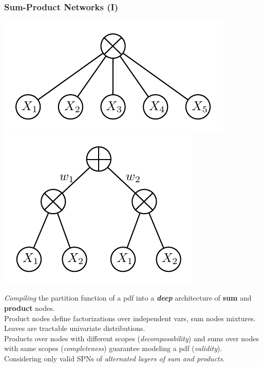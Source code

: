 \documentclass[xcolor={usenames,dvipsnames,svgnames}, compress]{beamer}
\begin{document}
\begin{frame}
  \frametitle{Sum-Product Networks (I)}
  \begin{minipage}{0.45\linewidth}
    \centering
    \includegraphics[width=0.8\linewidth]{figures/spn-prod}\\
    \includegraphics[width=0.73\linewidth]{figures/spn-sum}
  \end{minipage}%
  \begin{minipage}{0.5\linewidth}
    \vspace{0pt}
    \footnotesize
    \emph{Compiling} the partition function of a pdf into a \textbf{\emph{deep}} architecture of \textbf{sum}
    and \textbf{product} nodes.\\

    Product nodes define factorizations over independent vars, sum
    nodes mixtures. Leaves are tractable univariate distributions.\\


    Products over nodes with different scopes (\emph{decomposability}) and
    sums over nodes with same scopes (\emph{completeness}) guarantee modeling
    a pdf (\emph{validity}).\\

    Considering only valid SPNs of \emph{alternated layers of sum and products}.

    

    

  \end{minipage}
\end{frame}
\end{document}
